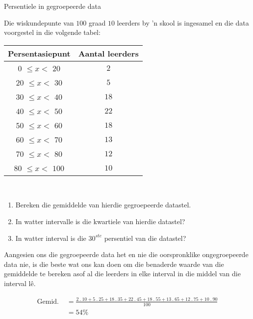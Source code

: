 \begin{wex}{Persentiele in gegroepeerde data}
{Die wiskundepunte van $100$ graad $10$ leerders by ’n skool is ingesamel en die data voorgestel in die volgende tabel:\\
    \begin{center}
      \begin{tabular}{|c|c|}  \hline
       
       \textbf{Persentasiepunt} & \textbf{Aantal leerders} \\  \hline

         $0$  $ \leq x < $   $20$ &  $2$ \\ \hline
        $20$  $ \leq x < $   $30$ &  $5$ \\\hline
        $30$  $ \leq x < $   $40$ & $18$ \\\hline
        $40$  $ \leq x < $   $50$ & $22$ \\\hline
        $50$  $ \leq x < $   $60$ & $18$ \\\hline
        $60$  $ \leq x < $   $70$ & $13$ \\\hline
        $70$  $ \leq x < $   $80$ & $12$ \\\hline
        $80$  $ \leq x < $  $100$ & $10$ \\\hline
   
      \end{tabular}
    \end{center}
\vspace {8pt}\\
\begin{minipage}{\textwidth}
    \begin{enumerate}[noitemsep, label=\textbf{\arabic*}.]
    \item Bereken die gemiddelde van hierdie gegroepeerde datastel.
    \item In watter intervalle is die kwartiele van hierdie datastel?
    \item In watter interval is die $30^{ste}$ persentiel van die datastel?
    \end{enumerate}
\end{minipage}
}{

  Aangesien ons die gegroepeerde data het en nie die oorspronklike ongegroepeerde data nie, is die beste wat ons kan doen om die benaderde waarde van die gemiddelde te bereken asof al die leerders in elke interval in die middel van die interval l\^e.

  \begin{align*}
 \mbox{Gemid. } &=  \frac{
         2\:.\:10
      +  5\:.\:25
      + 18\:.\:35
      + 22\:.\:45
      + 18\:.\:55
      + 13\:.\:65
      + 12\:.\:75
      + 10\:.\:90
    }{100}\\
    &= 54\%
  \end{align*}

}
\end{wex}
